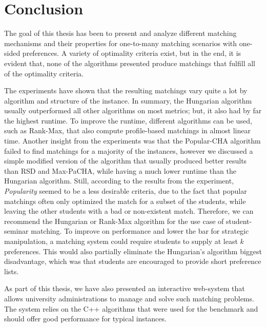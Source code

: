 \section{Conclusion}

The goal of this thesis has been to present and analyze different matching mechanisms and their properties for one-to-many matching scenarios with one-sided preferences. A variety of optimality criteria exist, but in the end, it is evident that, none of the algorithms presented produce matchings that fulfill all of the optimality criteria. 

The experiments have shown that the resulting matchings vary quite a lot by algorithm and structure of the instance. In summary, the Hungarian algorithm usually outperformed all other algorithms on most metrics; but, it also had by far the highest runtime. To improve the runtime, different algorithms can be used, such as Rank-Max, that also compute profile-based matchings in almost linear time. Another insight from the experiments was that the Popular-CHA algorithm failed to find matchings for a majority of the instances, however we discussed a simple modified version of the algorithm that usually produced better results than RSD and Max-PaCHA, while having a much lower runtime than the Hungarian algorithm. Still, according to the results from the experiment, \emph{Popularity} seemed to be a less desirable criteria, due to the fact that popular matchings often only optimized the match for a subset of the students, while leaving the other students with a bad or non-existent match. Therefore, we can recommend the Hungarian or Rank-Max algorithm for the use case of student-seminar matching. To improve on performance and lower the bar for strategic manipulation, a matching system could require students to supply at least $k$ preferences. This would also partially eliminate the Hungarian's algorithm biggest disadvantage, which was that students are encouraged to provide short preference lists.

As part of this thesis, we have also presented an interactive web-system that allows university administrations to manage and solve such matching problems. The system relies on the C++ algorithms that were used for the benchmark and should offer good performance for typical instances.  